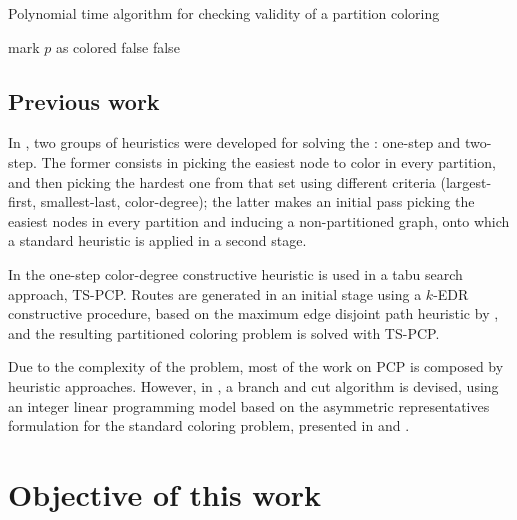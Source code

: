 \begin{algorithm}
\caption{Polynomial time algorithm for checking validity of a partition coloring}
\label{alg:pcpvalidity}
\begin{algorithmic}

			\STATE mark $p$ as colored
					\RETURN false
				\ENDIF	
			\ENDFOR
		\ENDIF
	\ENDFOR
		\RETURN false
	\ENDIF	
\ENDFOR

\end{algorithmic}
\end{algorithm}

\subsection*{Previous work}

In \cite{Li00thepartition}, two groups of heuristics were developed for solving the \PCP{}: one-step and two-step. The former consists in picking the easiest node to color in every partition, and then picking the hardest one from that set using different criteria (largest-first, smallest-last, color-degree); the latter makes an initial pass picking the easiest nodes in every partition and inducing a non-partitioned graph, onto which a standard heuristic is applied in a second stage.

In \cite{noronha2006routing} the one-step color-degree constructive heuristic is used in a tabu search approach, TS-PCP. Routes are generated in an initial stage using a $k$-EDR constructive procedure, based on the maximum edge disjoint path heuristic by \cite{kleinberg1996approximation}, and the resulting partitioned coloring problem is solved with TS-PCP.

Due to the complexity of the problem, most of the work on PCP is composed by heuristic approaches. However, in \cite{frota2010branch}, a branch and cut algorithm is devised, using an integer linear programming model based on the asymmetric representatives formulation for the standard coloring problem, presented in \cite{campelo2004cliques} and \cite{campelo2008asymmetric}.

\section{Objective of this work}

